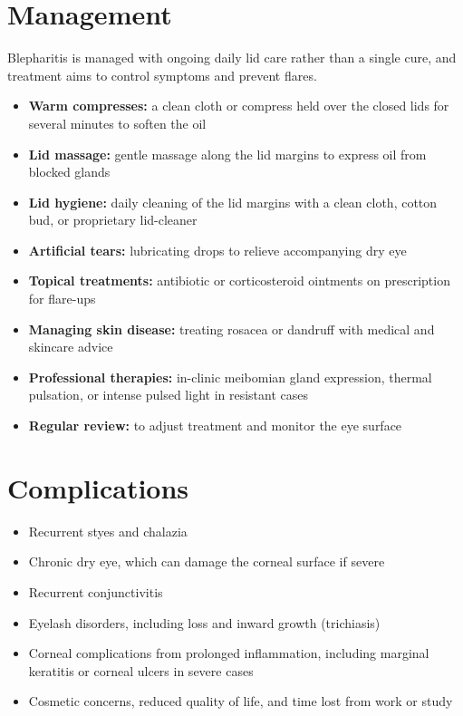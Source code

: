 \section*{Management}
Blepharitis is managed with ongoing daily lid care rather than a single cure, and treatment aims to control symptoms and prevent flares.

\begin{itemize}
    \item \textbf{Warm compresses:} a clean cloth or compress held over the closed lids for several minutes to soften the oil
    \item \textbf{Lid massage:} gentle massage along the lid margins to express oil from blocked glands
    \item \textbf{Lid hygiene:} daily cleaning of the lid margins with a clean cloth, cotton bud, or proprietary lid-cleaner
    \item \textbf{Artificial tears:} lubricating drops to relieve accompanying dry eye
    \item \textbf{Topical treatments:} antibiotic or corticosteroid ointments on prescription for flare-ups
    \item \textbf{Managing skin disease:} treating rosacea or dandruff with medical and skincare advice
    \item \textbf{Professional therapies:} in-clinic meibomian gland expression, thermal pulsation, or intense pulsed light in resistant cases
    \item \textbf{Regular review:} to adjust treatment and monitor the eye surface
\end{itemize}

\section*{Complications}
\begin{itemize}
    \item Recurrent styes and chalazia
    \item Chronic dry eye, which can damage the corneal surface if severe
    \item Recurrent conjunctivitis
    \item Eyelash disorders, including loss and inward growth (trichiasis)
    \item Corneal complications from prolonged inflammation, including marginal keratitis or corneal ulcers in severe cases
    \item Cosmetic concerns, reduced quality of life, and time lost from work or study
\end{itemize}

